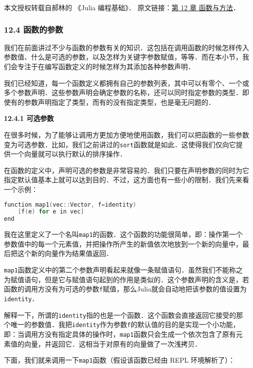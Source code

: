 
本文授权转载自郝林的 《Julia 编程基础》． 原文链接：\href{https://github.com/hyper0x/JuliaBasics/blob/master/book/ch12.md}{第 12 章 函数与方法}．

\subsubsection{12.4 函数的参数}

我们在前面讲过不少与函数的参数有关的知识．这包括在调用函数的时候怎样传入参数值、什么是可选的参数，以及怎样为关键字参数赋值，等等．而在本小节，我们会专注于在编写函数定义的时候怎样为其添加各种参数声明．

我们已经知道，每一个函数定义都拥有自己的参数列表，其中可以有零个、一个或多个参数声明．这些参数声明会确定参数的名称，还可以同时指定参数的类型．即使有的参数声明指定了类型，而有的没有指定类型，也是毫无问题的．

\textbf{12.4.1 可选参数}

在很多时候，为了能够让调用方更加方便地使用函数，我们可以把函数的一些参数变为可选参数．比如，我们之前讲过的\verb|sort|函数就是如此．这使得我们仅向它提供一个向量就可以执行默认的排序操作．

在函数的定义中，声明可选的参数是非常容易的．我们只要在声明参数的同时为它指定默认值基本上就可以达到目的．不过，这方面也有一些小的限制．我们先来看一个示例：

\begin{lstlisting}[language=cpp]
function map1(vec::Vector, f=identity)
    [f(e) for e in vec]
end
\end{lstlisting}

我在这里定义了一个名叫\verb|map1|的函数．这个函数的功能很简单，即：操作第一个参数值中的每一个元素值，并把操作所产生的新值依次地放到一个新的向量中，最后把这个新的向量作为结果值返回．

\verb|map1|函数定义中的第二个参数声明看起来就像一条赋值语句．虽然我们不能称之为赋值语句，但是它与赋值语句起到的作用是类似的．这个参数声明的含义是，若函数的调用方没有为可选的参数\verb|f|赋值，那么Julia就会自动地把该参数的值设置为\verb|identity|．

解释一下，所谓的\verb|identity|指的也是一个函数．这个函数会直接返回它接受的那个唯一的参数值．我把\verb|identity|作为参数\verb|f|的默认值的目的是实现一个小功能，即：当调用方没有指定具体的操作时，\verb|map1|函数只会生成一个依次包含了原有元素值的向量，并返回它．这相当于对原有的向量做了一次浅拷贝．

下面，我们就来调用一下\verb|map1|函数（假设该函数已经由 REPL 环境解析了）：

